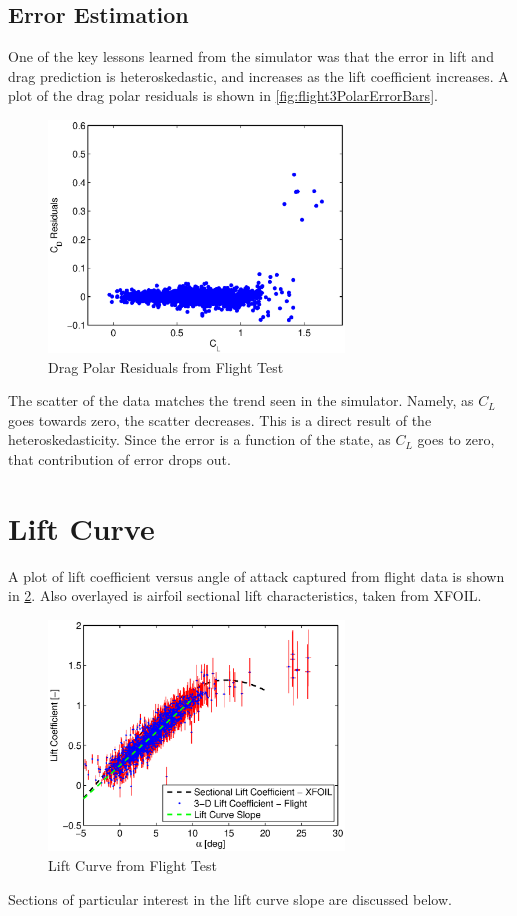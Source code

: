 \subsection{Error Estimation}
One of the key lessons learned from the simulator was that the error in lift and drag prediction is heteroskedastic, and increases as the lift coefficient increases. A plot of the drag polar residuals is shown in \ref{fig:flight3PolarErrorBars}.
\begin{figure}[H]
  \centering
    \includegraphics[width=0.7\textwidth]{figures/flight3Residuals.eps}  \caption{Drag Polar Residuals from Flight Test} \label{fig:flight3PolarNoError}
\end{figure}
The scatter of the data matches the trend seen in the simulator. Namely, as $C_L$ goes towards zero, the scatter decreases. This is a direct result of the heteroskedasticity. Since the error is a function of the state, as $C_L$ goes to zero, that contribution of error drops out.
\section{Lift Curve}
A plot of lift coefficient versus angle of attack captured from flight data is shown in \ref{fig:flight3LiftCurve}. Also overlayed is airfoil sectional lift characteristics, taken from XFOIL.
\begin{figure}[H]
  \centering
    \includegraphics[width=0.7\textwidth]{figures/flight3LiftCurve.eps}  \caption{Lift Curve from Flight Test} \label{fig:flight3LiftCurve}
\end{figure}
Sections of particular interest in the lift curve slope are discussed below.

